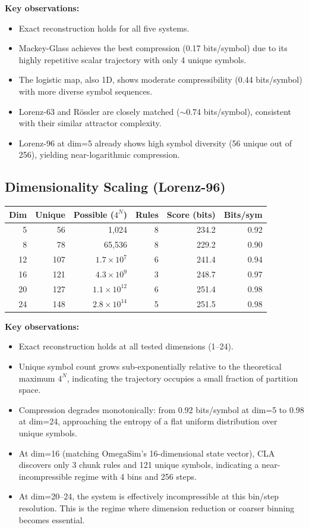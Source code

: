 \documentclass[11pt]{article}
\begin{document}
\textbf{Key observations:}
\begin{itemize}[noitemsep]
    \item Exact reconstruction holds for all five systems.
    \item Mackey-Glass achieves the best compression (0.17 bits/symbol) due to its highly repetitive scalar trajectory with only 4 unique symbols.
    \item The logistic map, also 1D, shows moderate compressibility (0.44 bits/symbol) with more diverse symbol sequences.
    \item Lorenz-63 and R\"ossler are closely matched ($\sim$0.74 bits/symbol), consistent with their similar attractor complexity.
    \item Lorenz-96 at dim=5 already shows high symbol diversity (56 unique out of 256), yielding near-logarithmic compression.
\end{itemize}

\subsection{Dimensionality Scaling (Lorenz-96)}

\begin{center}
\begin{tabular}{rrrrrr}
\toprule
Dim & Unique & Possible ($4^N$) & Rules & Score (bits) & Bits/sym \\
\midrule
5 & 56 & 1{,}024 & 8 & 234.2 & 0.92 \\
8 & 78 & 65{,}536 & 8 & 229.2 & 0.90 \\
12 & 107 & $1.7\times10^7$ & 6 & 241.4 & 0.94 \\
16 & 121 & $4.3\times10^9$ & 3 & 248.7 & 0.97 \\
20 & 127 & $1.1\times10^{12}$ & 6 & 251.4 & 0.98 \\
24 & 148 & $2.8\times10^{14}$ & 5 & 251.5 & 0.98 \\
\bottomrule
\end{tabular}
\end{center}

\textbf{Key observations:}
\begin{itemize}[noitemsep]
    \item Exact reconstruction holds at all tested dimensions (1--24).
    \item Unique symbol count grows sub-exponentially relative to the theoretical maximum $4^N$, indicating the trajectory occupies a small fraction of partition space.
    \item Compression degrades monotonically: from 0.92 bits/symbol at dim=5 to 0.98 at dim=24, approaching the entropy of a flat uniform distribution over unique symbols.
    \item At dim=16 (matching OmegaSim's 16-dimensional state vector), CLA discovers only 3 chunk rules and 121 unique symbols, indicating a near-incompressible regime with 4 bins and 256 steps.
    \item At dim=20--24, the system is effectively incompressible at this bin/step resolution. This is the regime where dimension reduction or coarser binning becomes essential.
\end{itemize}
\end{document}
